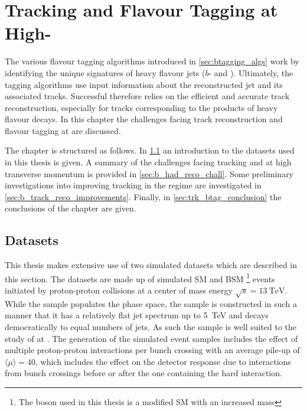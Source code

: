 \chapter{Tracking and Flavour Tagging at High-\texorpdfstring{\pt}{pt}}\label{chap:tracking}

The various flavour tagging algorithms introduced in \cref{sec:btagging_algs} work by identifying the unique signatures of heavy flavour jets ($b$- and \cjets).
Ultimately, the tagging algorithms use input information about the reconstructed jet and its associated tracks.
Successful \btagging therefore relies on the efficient and accurate track reconstruction, especially for tracks corresponding to the products of heavy flavour decays.
In this chapter the challenges facing track reconstruction and flavour tagging at \highpt are discussed.


The chapter is structured as follows.
In \cref{sec:track_classifier_datasets} an introduction to the datasets used in this thesis is given.
A summary of the challenges facing tracking and \btagging at high transverse momentum is provided in \cref{sec:b_had_reco_chall}.
Some preliminary investigations into improving tracking in the \highpt regime are investigated in \cref{sec:b_track_reco_improvements}.
Finally, in \cref{sec:trk_btag_conclusion} the conclusions of the chapter are given.


\section{Datasets}\label{sec:track_classifier_datasets}


\newcommand{\hdampFootnote}{%
The $h_\text{damp}$ parameter of the \textsc{PowhegBox} generator is used to limit the effect of resummed higher order corrections.%
It is used to suppress the transverse momentum of the radiation which the \ttbar system recoils against.%
}

This thesis makes extensive use of two simulated datasets which are described in this section.
The datasets are made up of simulated SM \ttbar and BSM \Zprime\footnote{The \Zprime boson used in this thesis is a modified SM \Zboson with an increased mass} events initiated by proton-proton collisions at a center of mass energy $\sqrt{s} = \SI{13}{\TeV}$.
While the \ttbar sample populates the \lowpt phase space, the \Zprime sample is constructed in such a manner that it has a relatively flat jet \pt spectrum up to \SI{5}{\TeV} and decays democratically to equal numbers of \bcl jets.
As such the \Zprime sample is well suited to the study of \btagging at \highpt.
The generation of the simulated event samples includes the effect of multiple proton-proton interactions per bunch crossing with an average pile-up of $\langle \mu \rangle = 40$, which includes the effect on the detector response due to interactions from bunch crossings before or after the one containing the hard interaction.

